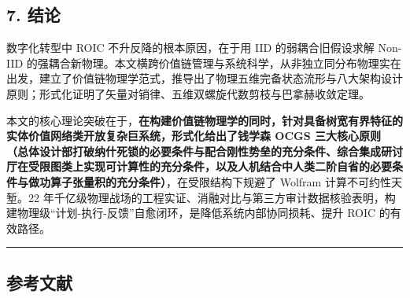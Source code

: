 \documentclass[
]{article}
\begin{document}
\subsection{7. 结论}\label{ux7ed3ux8bba}

数字化转型中 ROIC 不升反降的根本原因，在于用 IID 的弱耦合旧假设求解
Non-IID
的强耦合新物理。本文横跨价值链管理与系统科学，从非独立同分布物理实在出发，建立了价值链物理学范式，推导出了物理五维完备状态流形与八大架构设计原则；形式化证明了矢量对销律、五维双螺旋代数剪枝与巴拿赫收敛定理。

本文的核心理论突破在于，\textbf{在构建价值链物理学的同时，针对具备树宽有界特征的实体价值网络类开放复杂巨系统，形式化给出了钱学森
OCGS
三大核心原则（总体设计部打破纳什死锁的必要条件与配合刚性势垒的充分条件、综合集成研讨厅在受限图类上实现可计算性的充分条件，以及人机结合中人类二阶自省的必要条件与做功算子张量积的充分条件）}，在受限结构下规避了
Wolfram 计算不可约性天堑。22
年千亿级物理战场的工程实证、消融对比与第三方审计数据核验表明，构建物理级``计划-执行-反馈''自愈闭环，是降低系统内部协同损耗、提升
ROIC 的有效路径。

\begin{center}\rule{0.5\linewidth}{0.5pt}\end{center}

\subsection{参考文献}\label{ux53c2ux8003ux6587ux732e}
\end{document}
